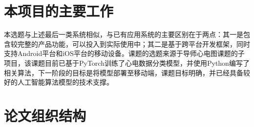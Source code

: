 \section{本项目的主要工作}\label{sec:work}


本选题与上述最后一类系统相似，与已有应用系统的主要区别在于两点：其一是包含较完整的产品功能，可以投入到实际使用中；其二是基于跨平台开发框架，同时支持Android平台和iOS平台的移动设备。课题的选题来源于导师心电图课题的子项目，该课题目前已基于PyTorch训练了心电数据分类模型，并使用Python编写了相关算法，下一阶段的目标是将模型部署至移动端，课题目标明确，并已经具备较好的人工智能算法模型的技术支撑。


\section{论文组织结构}\label{sec:structure}

